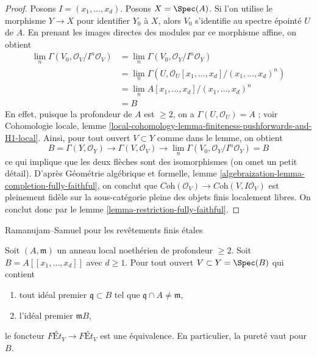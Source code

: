\begin{proof}
Posons $I = (x_1, \ldots, x_d)$. Posons $X = \Spec(A)$.
Si l'on utilise le morphisme $Y \to X$ pour identifier $Y_0$ à $X$,
alors $V_0$ s'identifie au spectre épointé $U$ de $A$.
En prenant les images directes des modules par ce morphisme affine, on obtient
\begin{align*}
\lim_n \Gamma(V_0, \mathcal{O}_V/I^n\mathcal{O}_V)
& =
\lim_n \Gamma(V_0, \mathcal{O}_Y/I^n\mathcal{O}_Y) \\
& =
\lim_n \Gamma(U, \mathcal{O}_U[x_1, \ldots, x_d]/(x_1, \ldots, x_d)^n) \\
& =
\lim_n A[x_1, \ldots, x_d]/(x_1, \ldots, x_d)^n \\
& =
B
\end{align*}
En effet, puisque la profondeur de $A$ est $\geq 2$, on a $\Gamma(U, \mathcal{O}_U) = A$ ;
voir Cohomologie locale, lemme
\ref{local-cohomology-lemma-finiteness-pushforwards-and-H1-local}.
Ainsi, pour tout ouvert $V \subset Y$ comme dans le lemme, on obtient
$$
B = \Gamma(Y, \mathcal{O}_Y) \to \Gamma(V, \mathcal{O}_V) \to
\lim_n \Gamma(V_0, \mathcal{O}_Y/I^n\mathcal{O}_Y) = B
$$
ce qui implique que les deux flèches sont des isomorphismes (on omet un petit détail).
D'après Géométrie algébrique et formelle, lemme
\ref{algebraization-lemma-completion-fully-faithful},
on conclut que
$\textit{Coh}(\mathcal{O}_V) \to \textit{Coh}(V, I\mathcal{O}_V)$
est pleinement fidèle sur la sous-catégorie pleine des objets finis localement libres.
On conclut donc par le
lemme \ref{lemma-restriction-fully-faithful}.
\end{proof}

\begin{lemma}
\label{lemma-purity-power-series-over-depth2}
\begin{slogan}
Ramanujam--Samuel pour les revêtements finis étales
\end{slogan}
Soit $(A, \mathfrak m)$ un anneau local noethérien de profondeur $\geq 2$. Soit
$B = A[[x_1, \ldots, x_d]]$ avec $d \geq 1$. Pour tout ouvert
$V \subset Y = \Spec(B)$ qui contient
\begin{enumerate}
\item tout idéal premier $\mathfrak q \subset B$ tel que
$\mathfrak q \cap A \not = \mathfrak m$,
\item l'idéal premier $\mathfrak m B$,
\end{enumerate}
le foncteur
$
\textit{F\'Et}_Y
\to
\textit{F\'Et}_V
$
est une équivalence. En particulier, la pureté vaut pour $B$.
\end{lemma}

